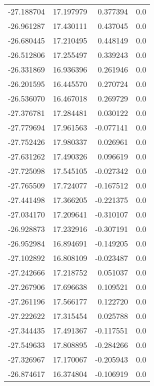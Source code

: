 \begin{tabular}{rrrr}
      -27.188704 &        17.197979 &    0.377394 &   0.0 \\
      -26.961287 &        17.430111 &    0.437045 &   0.0 \\
      -26.680445 &        17.210495 &    0.448149 &   0.0 \\
      -26.512806 &        17.255497 &    0.339243 &   0.0 \\
      -26.331869 &        16.936396 &    0.261946 &   0.0 \\
      -26.201595 &        16.445570 &    0.270724 &   0.0 \\
      -26.536070 &        16.467018 &    0.269729 &   0.0 \\
      -27.376781 &        17.284481 &    0.030122 &   0.0 \\
      -27.779694 &        17.961563 &   -0.077141 &   0.0 \\
      -27.752426 &        17.980337 &    0.026961 &   0.0 \\
      -27.631262 &        17.490326 &    0.096619 &   0.0 \\
      -27.725098 &        17.545105 &   -0.027342 &   0.0 \\
      -27.765509 &        17.724077 &   -0.167512 &   0.0 \\
      -27.441498 &        17.366205 &   -0.221375 &   0.0 \\
      -27.034170 &        17.209641 &   -0.310107 &   0.0 \\
      -26.928873 &        17.232916 &   -0.307191 &   0.0 \\
      -26.952984 &        16.894691 &   -0.149205 &   0.0 \\
      -27.102892 &        16.808109 &   -0.023487 &   0.0 \\
      -27.242666 &        17.218752 &    0.051037 &   0.0 \\
      -27.267906 &        17.696638 &    0.109521 &   0.0 \\
      -27.261196 &        17.566177 &    0.122720 &   0.0 \\
      -27.222622 &        17.315454 &    0.025788 &   0.0 \\
      -27.344435 &        17.491367 &   -0.117551 &   0.0 \\
      -27.549633 &        17.808895 &   -0.284266 &   0.0 \\
      -27.326967 &        17.170067 &   -0.205943 &   0.0 \\
      -26.874617 &        16.374804 &   -0.106919 &   0.0 \\

\end{tabular}
